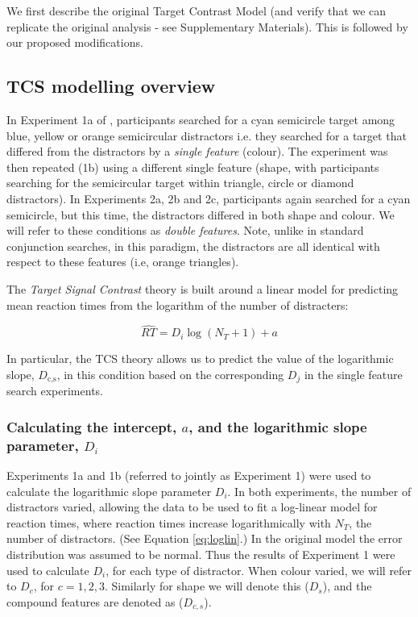\documentclass[smallextended, natbib]{svjour3}       %
\begin{document}
We first describe the original Target Contrast Model (and verify that we can replicate the original analysis - see Supplementary Materials). This is followed by our proposed modifications.

\subsection{TCS modelling overview} 

In Experiment 1a of \cite{buetti2019predicting}, participants searched for a cyan semicircle target among blue, yellow or orange semicircular distractors i.e. they searched for a target that differed from the distractors by a \textit{single feature} (colour). The experiment was then repeated (1b) using a different single feature (shape, with participants searching for the semicircular target within triangle, circle or diamond distractors). In Experiments 2a, 2b and 2c, participants again searched for a cyan semicircle, but this time, the distractors differed in both shape and colour. We will refer to these conditions as \textit{double features}. Note, unlike in standard conjunction searches, in this paradigm, the distractors are all identical with respect to these features (i.e, orange triangles). 

The \textit{Target Signal Contrast} theory is built around a linear model for predicting mean reaction times from the logarithm of the number of distracters: 

\begin{equation}
\hat{RT} = D_i\log(N_T+1) + a
\label{eq:loglin}
\end{equation}

In particular, the TCS theory allows us to predict the value of the logarithmic slope, $D_\text{c,s}$, in this condition based on the corresponding $D_j$ in the single feature search experiments. 


\subsubsection{Calculating the intercept, $a$, and the logarithmic slope parameter, $D_i$}
\label{sec:fitting_D}

Experiments 1a and 1b (referred to jointly as Experiment 1) were used to calculate the logarithmic slope parameter $D_i$. In both experiments, the number of distractors varied, allowing the data to be used to fit a log-linear model for reaction times, where reaction times increase logarithmically with $N_T$, the number of distractors. (See Equation \ref{eq:loglin}.) In the original model the error distribution was assumed to be normal. Thus the results of Experiment 1 were used to calculate $D_i$, for each type of distractor. When colour varied, we will refer to $D_c$, for $c=1,2,3$. Similarly for shape we will denote this ($D_s$), and the compound features are denoted as ($D_{c,s}$). 
\end{document}
